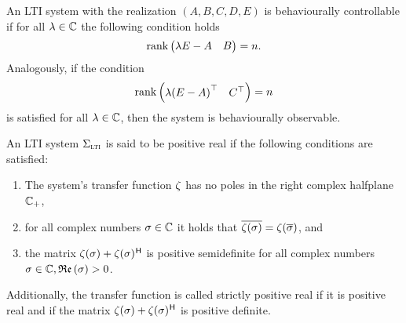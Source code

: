 \begin{definition}\label{def:behaviourally-controllable-observable}
    An \ac{LTI} system with the realization $(A, B, C, D, E)$ is behaviourally controllable if for all $\lambda \in \mathbb{C}$ the following condition holds
    \begin{equation}\label{eq:behaviourally-controllable}
        \mathop{}\!\mathrm{rank}\left(\begin{matrix}
            \lambda E - A & B
        \end{matrix}\right) = n.
    \end{equation}
    Analogously, if the condition
    \begin{equation}\label{eq:behaviourally-observable}
        \mathop{}\!\mathrm{rank}\left(\begin{matrix}
            \lambda {(E - A)}^{\top} & C^{\top}
        \end{matrix}\right) = n
    \end{equation}
    is satisfied for all $\lambda \in \mathbb{C}$, then the system is behaviourally observable.
\end{definition}

\begin{definition}\label{def:positive-real}
    An \ac{LTI} system $\Sigma_{\textnormal{\scshape lti}}$ is said to be positive real if the following conditions are satisfied:
    \begin{enumerate}
        \item The system's transfer function $\zeta$ has no poles in the right complex halfplane $\mathbb{C}_+$,
        \item for all complex numbers $\sigma \in \mathbb{C}$ it holds that $\overline{\zeta(\sigma)} = \zeta(\overline{\sigma})$, and
        \item the matrix $\zeta(\sigma) + \zeta(\sigma)^{\mkern1mu \mathsf{H}}$ is positive semidefinite for all complex numbers $\sigma \in \mathbb{C}, \mathop{}\!\mathfrak{Re}\left(\sigma\right) > 0$.
    \end{enumerate}
    Additionally, the transfer function is called strictly positive real if it is positive real and if the matrix $\zeta(\sigma) + \zeta(\sigma)^{\mkern1mu \mathsf{H}}$ is positive definite.
\end{definition}

